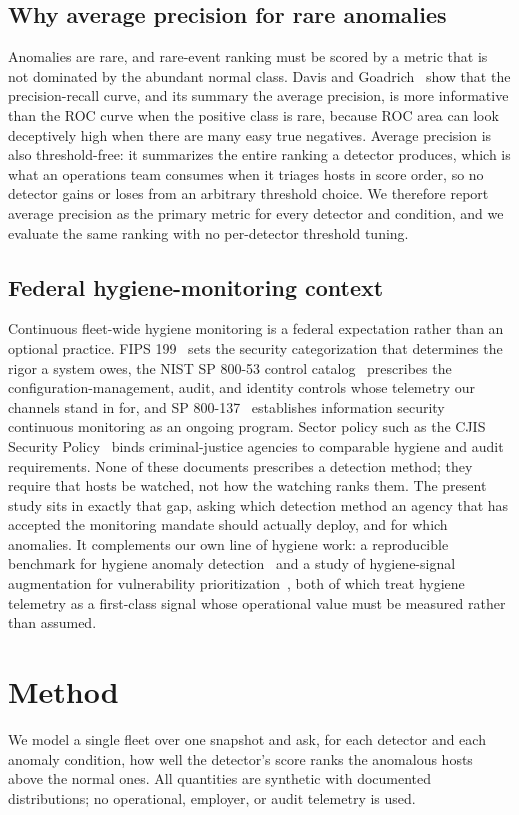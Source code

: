 \documentclass[journal]{IEEEtran}
\begin{document}
\subsection{Why average precision for rare anomalies}
Anomalies are rare, and rare-event ranking must be scored by a metric that is not dominated by the
abundant normal class. Davis and Goadrich~\cite{davis2006pr} show that the precision-recall curve,
and its summary the average precision, is more informative than the ROC curve when the positive
class is rare, because ROC area can look deceptively high when there are many easy true negatives.
Average precision is also threshold-free: it summarizes the entire ranking a detector produces,
which is what an operations team consumes when it triages hosts in score order, so no detector gains
or loses from an arbitrary threshold choice. We therefore report average precision as the primary
metric for every detector and condition, and we evaluate the same ranking with no per-detector
threshold tuning.

\subsection{Federal hygiene-monitoring context}
Continuous fleet-wide hygiene monitoring is a federal expectation rather than an optional practice.
FIPS 199~\cite{fips199} sets the security categorization that determines the rigor a system owes,
the NIST SP 800-53 control catalog~\cite{nist80053} prescribes the configuration-management,
audit, and identity controls whose telemetry our channels stand in for, and SP
800-137~\cite{nist80137} establishes information security continuous monitoring as an ongoing
program. Sector policy such as the CJIS Security Policy~\cite{cjis2023} binds criminal-justice
agencies to comparable hygiene and audit requirements. None of these documents prescribes a
detection method; they require that hosts be watched, not how the watching ranks them. The present
study sits in exactly that gap, asking which detection method an agency that has accepted the
monitoring mandate should actually deploy, and for which anomalies. It complements our own line of
hygiene work: a reproducible benchmark for hygiene anomaly detection~\cite{paper3hygienebench} and
a study of hygiene-signal augmentation for vulnerability
prioritization~\cite{paper4hygieneprio}, both of which treat hygiene telemetry as a first-class
signal whose operational value must be measured rather than assumed.

\section{Method}
We model a single fleet over one snapshot and ask, for each detector and each anomaly condition,
how well the detector's score ranks the anomalous hosts above the normal ones. All quantities are
synthetic with documented distributions; no operational, employer, or audit telemetry is used.
\end{document}
